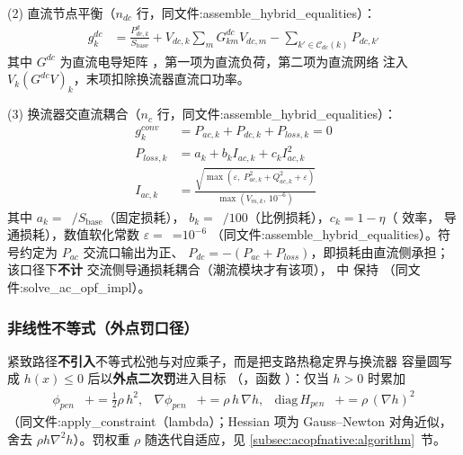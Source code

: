 (2) 直流节点平衡（$n_{dc}$ 行，同文件:assemble\_hybrid\_equalities）：
\begin{align*}
g^{dc}_k &= \frac{P^{d}_{dc,k}}{S_{\mathrm{base}}}
  + V_{dc,k}\sum_{m} G^{dc}_{km}V_{dc,m} - \sum_{k'\in\mathcal{C}_{dc}(k)} P_{dc,k'}
\end{align*}
其中 $G^{dc}$ 为直流电导矩阵 ，第一项为直流负荷，第二项为直流网络
注入 $V_k(G^{dc}V)_k$，末项扣除换流器直流口功率。

(3) 换流器交直流耦合（$n_c$ 行，同文件:assemble\_hybrid\_equalities）：
\begin{align*}
g^{conv}_k &= P_{ac,k} + P_{dc,k} + P_{loss,k} = 0\\
P_{loss,k} &= a_k + b_k I_{ac,k} + c_k I_{ac,k}^{2}\\
I_{ac,k} &= \frac{\sqrt{\max(\varepsilon,\;P_{ac,k}^{2}+Q_{ac,k}^{2}+\varepsilon)}}
                    {\max(V_{m,k},\,10^{-6})}
\end{align*}
其中 $a_k=$~$/S_{\mathrm{base}}$（固定损耗），
$b_k=$~$/100$（比例损耗），$c_k=1-\eta$（ 效率，
导通损耗），数值软化常数 $\varepsilon=$~=$10^{-6}$
（同文件:assemble\_hybrid\_equalities）。符号约定为 $P_{ac}$ 交流口输出为正、
$P_{dc}=-(P_{ac}+P_{loss})$，即损耗由直流侧承担；该口径下\textbf{不计}
 交流侧导通损耗耦合（潮流模块才有该项），
 中 
保持 （同文件:solve\_ac\_opf\_impl）。

\subsubsection*{非线性不等式（外点罚口径）}
紧致路径\textbf{不引入}不等式松弛与对应乘子，而是把支路热稳定界与换流器
容量圆写成 $h(x)\le 0$ 后以\textbf{外点二次罚}进入目标
（，函数
）：仅当 $h>0$ 时累加
\begin{align*}
\phi_{pen} &\mathrel{+}= \tfrac{1}{2}\rho\,h^{2}, &
\nabla\phi_{pen} &\mathrel{+}= \rho\,h\,\nabla h, &
\mathrm{diag}\,H_{pen} &\mathrel{+}= \rho\,(\nabla h)^{2}
\end{align*}
（同文件:apply\_constraint（lambda）；Hessian 项为 Gauss--Newton 对角近似，舍去
$\rho h\nabla^{2}h$）。罚权重 $\rho$ 随迭代自适应，见
\ref{subsec:acopfnative:algorithm}~节。

